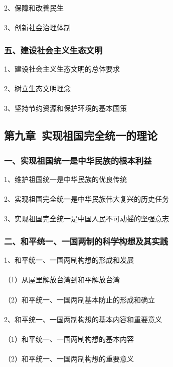 \documentclass{ctexart}
\begin{document}
2、保障和改善民生
\\\\

3、创新社会治理体制

\subsubsection{五、建设社会主义生态文明}
1、建设社会主义生态文明的总体要求
\\\\

2、树立生态文明理念
\\\\

3、坚持节约资源和保护环境的基本国策

\subsection{第九章\ 实现祖国完全统一的理论}
\subsubsection{一、实现祖国统一是中华民族的根本利益}
1、维护祖国统一是中华民族的优良传统
\\\\

2、实现祖国完全统一是中华民族伟大复兴的历史任务
\\\\

3、实现祖国完全统一是中国人民不可动摇的坚强意志

\subsubsection{二、和平统一、一国两制的科学构想及其实践}
1、和平统一、一国两制构想的形成和发展
\\\\
（1）从屋里解放台湾到和平解放台湾
\\\\
（2）和平统一、一国两制基本防止的形成和确立
\\\\

2、和平统一、一国两制构想的基本内容和重要意义
\\\\
（1）和平统一、一国两制构想的基本内容
\\\\
（2）和平统一、一国两制构想的重要意义
\\\\
\end{document}
